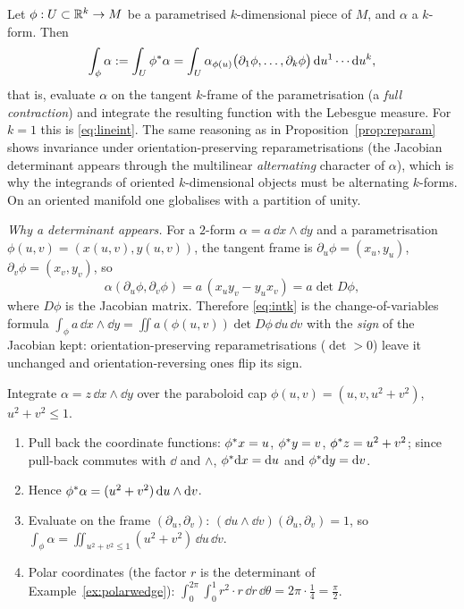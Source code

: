 Let $\phi:U\subset\mathbb{R}^k\to M$ be a parametrised $k$-dimensional piece of $M$, and $\alpha$ a $k$-form. Then
\begin{equation}\label{eq:intk}
\int_\phi\alpha:=\int_U\phi{}^{*}\alpha=\int_U\alpha_{\phi(u)}\bigl(\partial_1\phi,\dots,\partial_k\phi\bigr)\,\mathrm{d} u^1\cdots\mathrm{d} u^k,
\end{equation}
that is, evaluate $\alpha$ on the tangent $k$-frame of the parametrisation (a \emph{full contraction}) and integrate the resulting function with the Lebesgue measure. For $k=1$ this is \eqref{eq:lineint}.
The same reasoning as in Proposition~\ref{prop:reparam} shows invariance under orientation-preserving reparametrisations (the Jacobian determinant appears through the multilinear \emph{alternating} character of $\alpha$), which is why the integrands of oriented $k$-dimensional objects must be alternating $k$-forms. On an oriented manifold one globalises with a partition of unity.

\emph{Why a determinant appears.} For a $2$-form $\alpha=a\,\dd x\wedge\dd y$ and a parametrisation $\phi(u,v)=(x(u,v),y(u,v))$, the tangent frame is $\partial_u\phi=(x_u,y_u)$, $\partial_v\phi=(x_v,y_v)$, so
\[
\alpha(\partial_u\phi,\partial_v\phi)=a\,(x_uy_v-y_ux_v)=a\det D\phi,
\]
where $D\phi$ is the Jacobian matrix. Therefore \eqref{eq:intk} is the change-of-variables formula $\int_\phi a\,\dd x\wedge\dd y=\iint a(\phi(u,v))\det D\phi\,\dd u\,\dd v$ with the \emph{sign} of the Jacobian kept: orientation-preserving reparametrisations ($\det>0$) leave it unchanged and orientation-reversing ones flip its sign.

\begin{example}\label{ex:paraboloid}
Integrate $\alpha=z\,\dd x\wedge\dd y$ over the paraboloid cap $\phi(u,v)=(u,v,u^2+v^2)$, $u^2+v^2\le1$.
\begin{enumerate}
\item Pull back the coordinate functions: $\phi{}^{*} x=u$, $\phi{}^{*} y=v$, $\phi{}^{*} z=u^2+v^2$; since pull-back commutes with $\dd$ and $\wedge$, $\phi{}^{*}\mathrm{d} x=\mathrm{d} u$ and $\phi{}^{*}\mathrm{d} y=\mathrm{d} v$.
\item Hence $\phi{}^{*}\alpha=(u^2+v^2)\,\mathrm{d} u\wedge\mathrm{d} v$.
\item Evaluate on the frame $(\partial_u,\partial_v)$: $(\dd u\wedge\dd v)(\partial_u,\partial_v)=1$, so $\int_\phi\alpha=\iint_{u^2+v^2\le1}(u^2+v^2)\,\dd u\,\dd v$.
\item Polar coordinates (the factor $r$ is the determinant of Example~\ref{ex:polarwedge}): $\displaystyle\int_0^{2\pi}\!\!\int_0^1r^2\cdot r\,\dd r\,\dd\theta=2\pi\cdot\tfrac14=\tfrac\pi2$.
\end{enumerate}
\end{example}
